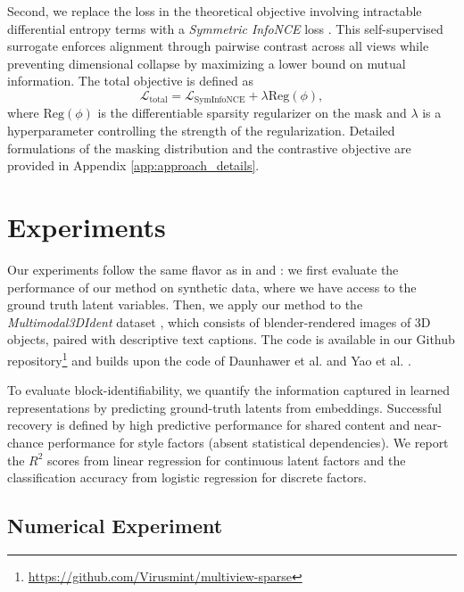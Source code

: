 \documentclass[a4paper,12pt]{article}
\begin{document}
Second, we replace the loss in the theoretical objective involving intractable differential entropy terms with a \textit{Symmetric InfoNCE} loss \cite{oord2019representationlearningcontrastivepredictive, radford2021learning}. This self-supervised surrogate enforces alignment through pairwise contrast across all views while preventing dimensional collapse by maximizing a lower bound on mutual information. The total objective is defined as
\begin{equation*}
  \mathcal{L}_{\text{total}} = \mathcal{L}_{\text{SymInfoNCE}} + \lambda \text{Reg}(\phi),
\end{equation*}
where $\mathrm{Reg}(\phi)$ is the differentiable sparsity regularizer on the mask and $\lambda$ is a hyperparameter controlling the strength of the regularization. Detailed formulations of the masking distribution and the contrastive objective are provided in Appendix \ref{app:approach_details}.

\section{Experiments}

Our experiments follow the same flavor as in \cite{daunhawer2023identifiabilityresultsmultimodalcontrastive} and \cite{yao2024multiviewcausalrepresentationlearning}: we first evaluate the performance of our method on synthetic data, where we have access to the ground truth latent variables. Then, we apply our method to the \textit{Multimodal3DIdent} dataset \cite{daunhawer2023identifiabilityresultsmultimodalcontrastive}, which consists of blender-rendered images of 3D objects, paired with descriptive text captions.
The code is available in our Github repository\footnote{\url{https://github.com/Virusmint/multiview-sparse}} and builds upon the code of Daunhawer et al. \cite{daunhawer2023identifiabilityresultsmultimodalcontrastive} and Yao et al. \cite{yao2024multiviewcausalrepresentationlearning}.

To evaluate block-identifiability, we quantify the information captured in learned representations by predicting ground-truth latents from embeddings. Successful recovery is defined by high predictive performance for shared content and near-chance performance for style factors (absent statistical dependencies). We report the $R^2$ scores from linear regression for continuous latent factors and the classification accuracy from logistic regression for discrete factors.

\subsection{Numerical Experiment}
\end{document}

